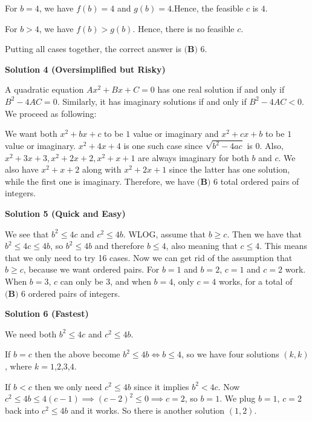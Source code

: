 \begin{enumerate}
 For $b = 4$, we have $f(b) = 4$ and $g(b) = 4$.Hence, the feasible $c$ is $4$.

 For $b > 4$, we have $f(b) > g(b)$. Hence, there is no feasible $c$.

 Putting all cases together, the correct answer is $\boxed{\textbf{(B) } 6}$.

 



\textbf{Solution 4 (Oversimplified but Risky)}

A quadratic equation $Ax^2+Bx+C=0$ has one real solution if and only if $B^2-4AC=0.$ Similarly, it has imaginary solutions if and only if $B^2-4AC<0.$ We proceed as following:

 We want both $x^2+bx+c$ to be $1$ value or imaginary and $x^2+cx+b$ to be $1$ value or imaginary. $x^2+4x+4$ is one such case since $\sqrt {b^2-4ac}$ is $0.$ Also, $x^2+3x+3, x^2+2x+2, x^2+x+1$ are always imaginary for both $b$ and $c.$ We also have $x^2+x+2$ along with $x^2+2x+1$ since the latter has one solution, while the first one is imaginary. Therefore, we have $\boxed{\textbf{(B) } 6}$ total ordered pairs of integers.

 



\textbf{Solution 5 (Quick and Easy)}

We see that $b^2 \leq 4c$ and $c^2 \leq 4b.$ WLOG, assume that $b \geq c.$ Then we have that $b^2 \leq 4c \leq 4b$, so $b^2 \leq 4b$ and therefore $b \leq 4$, also meaning that $c \leq 4.$ This means that we only need to try 16 cases. Now we can get rid of the assumption that $b \geq c$, because we want ordered pairs. For $b = 1$ and $b = 2$, $c = 1$ and $c = 2$ work. When $b = 3$, $c$ can only be $3$, and when $b = 4$, only $c = 4$ works, for a total of $\boxed{\textbf{(B) } 6}$ ordered pairs of integers.

 



\textbf{Solution 6 (Fastest)}

We need both $b^2\leq 4c$ and $c^2\leq 4b$. 

 If $b=c$ then the above become $b^2\leq 4b\iff b\leq 4$, so we have four solutions $(k,k)$, where $k=1$,$2$,$3$,$4$.

 If $b<c$ then we only need $c^2\leq 4b$ since it implies $b^2< 4c$. Now$c^2\leq 4b\leq 4(c-1) \implies (c-2)^2\leq 0 \implies c=2$, so $b=1$. We plug $b=1$, $c=2$ back into $c^2\leq 4b$ and it works. So there is another solution $(1,2)$.


\end{enumerate}

